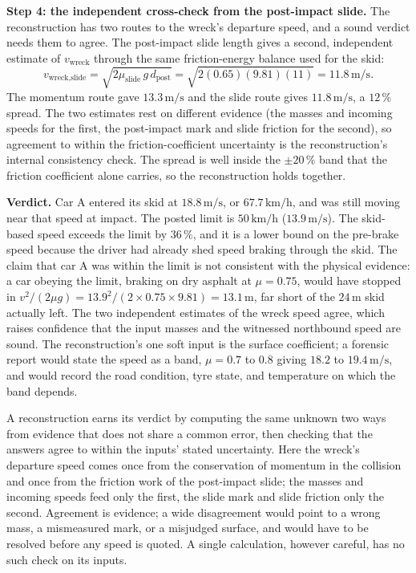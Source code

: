 \textbf{Step 4: the independent cross-check from the post-impact
slide.} The reconstruction has two routes to the wreck's departure
speed, and a sound verdict needs them to agree. The post-impact slide
length gives a second, independent estimate of $v_{\text{wreck}}$
through the same friction-energy balance used for the skid:
\[
v_{\text{wreck,slide}}=\sqrt{2\mu_{\text{slide}}\,g\,d_{\text{post}}}
=\sqrt{2(0.65)(9.81)(11)}=11.8\,\si{\meter\per\second}.
\]
The momentum route gave $13.3\,\si{\meter\per\second}$ and the slide
route gives $11.8\,\si{\meter\per\second}$, a $12\,\%$ spread. The two
estimates rest on different evidence (the masses and incoming speeds
for the first, the post-impact mark and slide friction for the second),
so agreement to within the friction-coefficient uncertainty is the
reconstruction's internal consistency check. The spread is well inside
the $\pm 20\,\%$ band that the friction coefficient alone carries, so
the reconstruction holds together.

\textbf{Verdict.} Car A entered its skid at $18.8\,\si{\meter\per
\second}$, or $67.7\,\si{\kilo\meter\per\hour}$, and was still moving
near that speed at impact. The posted limit is $50\,\si{\kilo\meter\per
\hour}$ ($13.9\,\si{\meter\per\second}$). The skid-based speed exceeds
the limit by $36\,\%$, and it is a lower bound on the pre-brake speed
because the driver had already shed speed braking through the skid.
The claim that car A was within the limit is not consistent with the
physical evidence: a car obeying the limit, braking on dry asphalt at
$\mu=0.75$, would have stopped in $v^{2}/(2\mu g)=13.9^{2}/(2\times
0.75\times 9.81)=13.1\,\si{\meter}$, far short of the
$24\,\si{\meter}$ skid actually left. The two independent estimates of
the wreck speed agree, which raises confidence that the input masses
and the witnessed northbound speed are sound. The reconstruction's one
soft input is the surface coefficient; a forensic report would state
the speed as a band, $\mu=0.7$ to $0.8$ giving
$18.2$ to $19.4\,\si{\meter\per\second}$, and would record the road
condition, tyre state, and temperature on which the band depends.

\begin{principle}
A reconstruction earns its verdict by computing the same unknown two
ways from evidence that does not share a common error, then checking
that the answers agree to within the inputs' stated uncertainty. Here
the wreck's departure speed comes once from the conservation of
momentum in the collision and once from the friction work of the
post-impact slide; the masses and incoming speeds feed only the first,
the slide mark and slide friction only the second. Agreement is
evidence; a wide disagreement would point to a wrong mass, a
mismeasured mark, or a misjudged surface, and would have to be resolved
before any speed is quoted. A single calculation, however careful, has
no such check on its inputs.
\end{principle}

